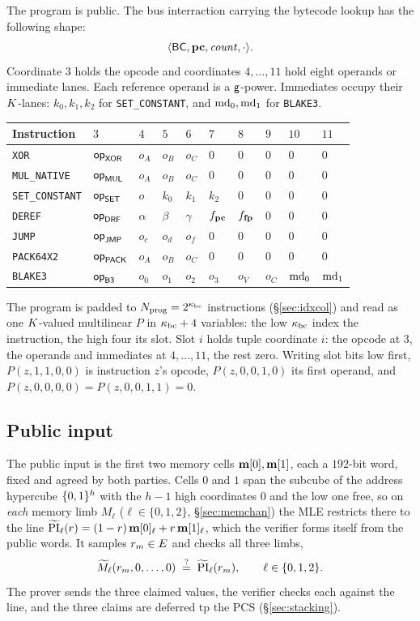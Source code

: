 The program is public. The bus interraction carrying the bytecode lookup has the following shape:
\[
  \langle \mathsf{BC},\mathbf{pc},\mathit{count},\cdot \rangle.
\]
Coordinate $3$ holds the opcode and coordinates $4,\ldots,11$ hold eight operands or immediate lanes. Each reference operand is a $\mathsf{g}$-power. Immediates occupy their $K$-lanes: $k_0,k_1,k_2$ for \texttt{SET\_CONSTANT}, and $\mathrm{md}_0,\mathrm{md}_1$ for \texttt{BLAKE3}.
\begin{center}
\begin{tabular}{llllllllll}
\hline
Instruction & $3$ & $4$ & $5$ & $6$ & $7$ & $8$ & $9$ & $10$ & $11$\\
\hline
\texttt{XOR}           & $\mathsf{op}_{\mathsf{XOR}}$ & $o_A$ & $o_B$ & $o_C$ & $0$ & $0$ & $0$ & $0$ & $0$\\
\texttt{MUL\_NATIVE}   & $\mathsf{op}_{\mathsf{MUL}}$ & $o_A$ & $o_B$ & $o_C$ & $0$ & $0$ & $0$ & $0$ & $0$\\
\texttt{SET\_CONSTANT} & $\mathsf{op}_{\mathsf{SET}}$ & $o$   & $k_0$ & $k_1$ & $k_2$ & $0$ & $0$ & $0$ & $0$\\
\texttt{DEREF}         & $\mathsf{op}_{\mathsf{DRF}}$ & $\alpha$ & $\beta$ & $\gamma$ & $f_{\mathbf{pc}}$ & $f_{\mathbf{fp}}$ & $0$ & $0$ & $0$\\
\texttt{JUMP}          & $\mathsf{op}_{\mathsf{JMP}}$ & $o_c$ & $o_d$ & $o_f$ & $0$ & $0$ & $0$ & $0$ & $0$\\
\texttt{PACK64X2}      & $\mathsf{op}_{\mathsf{PACK}}$ & $o_A$ & $o_B$ & $o_C$ & $0$ & $0$ & $0$ & $0$ & $0$\\
\texttt{BLAKE3}        & $\mathsf{op}_{\mathsf{B3}}$  & $o_0$ & $o_1$ & $o_2$ & $o_3$ & $o_V$ & $o_C$ & $\mathrm{md}_0$ & $\mathrm{md}_1$\\
\hline
\end{tabular}
\end{center}
The program is padded to $N_{\mathrm{prog}}=2^{\kappa_{\mathrm{bc}}}$ instructions (\S\ref{sec:idxcol}) and read as one $K$-valued multilinear $P$ in $\kappa_{\mathrm{bc}}+4$ variables: the low $\kappa_{\mathrm{bc}}$ index the instruction, the high four its slot. Slot $i$ holds tuple coordinate $i$: the opcode at $3$, the operands and immediates at $4,\dots,11$, the rest zero. Writing slot bits low first, $P(z,1,1,0,0)$ is instruction $z$'s opcode, $P(z,0,0,1,0)$ its first operand, and $P(z,0,0,0,0)=P(z,0,0,1,1)=0$.

\subsection{Public input}\label{sec:e2e-pi}

The public input is the first two memory cells $\mathbf{m}[0],\mathbf{m}[1]$, each a $192$-bit word, fixed and agreed by both parties. Cells $0$ and $1$ span the subcube of the address hypercube $\{0,1\}^{h}$ with the $h-1$ high coordinates $0$ and the low one free, so on \emph{each} memory limb $M_\ell$ ($\ell\in\{0,1,2\}$, \S\ref{sec:memchan}) the MLE restricts there to the line $\widetilde{\mathrm{PI}}_\ell(r)=(1-r)\,\mathbf{m}[0]_\ell+r\,\mathbf{m}[1]_\ell$, which the verifier forms itself from the public words. It samples $r_m\in E$ and checks all three limbs,
\[
  \widetilde M_\ell(r_m,0,\dots,0)\;\stackrel{?}{=}\;\widetilde{\mathrm{PI}}_\ell(r_m),\qquad \ell\in\{0,1,2\}.
\]
The prover sends the three claimed values, the verifier checks each against the line, and the three claims are deferred tp the PCS (\S\ref{sec:stacking}).

